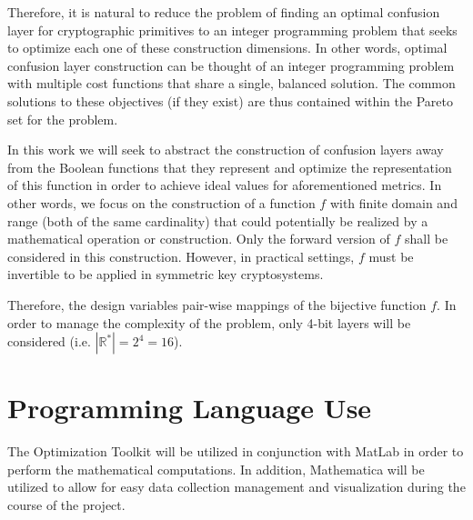\documentclass[11pt]{article}
\begin{document}
Therefore, it is natural to reduce the problem of finding an optimal confusion layer for cryptographic primitives to an integer programming problem that seeks to optimize each one of these construction dimensions. In other words, optimal confusion layer construction can be thought of an integer programming problem with multiple cost functions that share a single, balanced solution. The common solutions to these objectives (if they exist) are thus contained within the Pareto set for the problem.

In this work we will seek to abstract the construction of confusion layers away from the Boolean functions that they represent and optimize the representation of this function in order to achieve ideal values for aforementioned metrics. In other words, we focus on the construction of a function $f$ with finite domain and range (both of the same cardinality) that could potentially be realized by a mathematical operation or construction. Only the forward version of $f$ shall be considered in this construction. However, in practical settings, $f$ must be invertible to be applied in symmetric key cryptosystems. 

Therefore, the design variables pair-wise mappings of the bijective function $f$. In order to manage the complexity of the problem, only 4-bit layers will be considered (i.e. $|\mathbb{R^*}| = 2^4 = 16$).

\section{Programming Language Use}
The Optimization Toolkit will be utilized in conjunction with MatLab in order to perform the mathematical computations. In addition, Mathematica will be utilized to allow for easy data collection management and visualization during the course of the project. 



\end{document}
